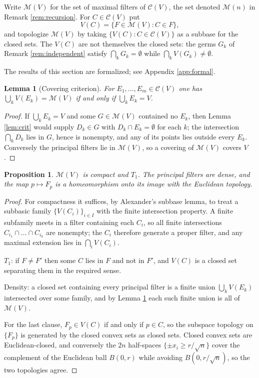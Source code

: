 \documentclass[11pt]{amsart}
\theoremstyle{plain}
\newtheorem{proposition}[theorem]{Proposition}
\newtheorem{lemma}[theorem]{Lemma}
\theoremstyle{definition}
\newcommand{\CC}{\mathscr{C}}
\begin{document}
Write $\mathcal{M}(V)$ for the set of maximal filters of $\CC(V)$, the set denoted $\mathcal{M}(n)$ in Remark \ref{rem:recursion}. For $C\in\CC(V)$ put
\[
V(C)=\{F\in\mathcal{M}(V):C\in F\},
\]
and topologize $\mathcal{M}(V)$ by taking $\{V(C):C\in\CC(V)\}$ as a subbase for the closed sets. The $V(C)$ are not themselves the closed sets: the germs $G_k$ of Remark \ref{rem:independent} satisfy $\bigcap_kG_k=\emptyset$ while $\bigcap_kV(G_k)\neq\emptyset$.

The results of this section are formalized; see Appendix \ref{app:formal}.

\begin{lemma}[Covering criterion]\label{lem:cover}
For $E_1,\dots,E_m\in\CC(V)$ one has $\bigcup_kV(E_k)=\mathcal{M}(V)$ if and only if $\bigcup_kE_k=V$.
\end{lemma}

\begin{proof}
If $\bigcup_kE_k=V$ and some $G\in\mathcal{M}(V)$ contained no $E_k$, then Lemma \ref{lem:crit} would supply $D_k\in G$ with $D_k\cap E_k=\emptyset$ for each $k$; the intersection $\bigcap_kD_k$ lies in $G$, hence is nonempty, and any of its points lies outside every $E_k$. Conversely the principal filters lie in $\mathcal{M}(V)$, so a covering of $\mathcal{M}(V)$ covers $V$.
\end{proof}

\begin{proposition}\label{prop:compact}
$\mathcal{M}(V)$ is compact and $T_1$. The principal filters are dense, and the map $p\mapsto F_p$ is a homeomorphism onto its image with the Euclidean topology.
\end{proposition}

\begin{proof}
For compactness it suffices, by Alexander's subbase lemma, to treat a subbasic family $\{V(C_i)\}_{i\in I}$ with the finite intersection property. A finite subfamily meets in a filter containing each $C_i$, so all finite intersections $C_{i_1}\cap\dots\cap C_{i_k}$ are nonempty; the $C_i$ therefore generate a proper filter, and any maximal extension lies in $\bigcap_iV(C_i)$.

$T_1$: if $F\neq F'$ then some $C$ lies in $F$ and not in $F'$, and $V(C)$ is a closed set separating them in the required sense.

Density: a closed set containing every principal filter is a finite union $\bigcup_kV(E_k)$ intersected over some family, and by Lemma \ref{lem:cover} each such finite union is all of $\mathcal{M}(V)$.

For the last clause, $F_p\in V(C)$ if and only if $p\in C$, so the subspace topology on $\{F_p\}$ is generated by the closed convex sets as closed sets. Closed convex sets are Euclidean-closed, and conversely the $2n$ half-spaces $\{\pm x_i\ge r/\sqrt{n}\}$ cover the complement of the Euclidean ball $B(0,r)$ while avoiding $B(0,r/\sqrt{n})$, so the two topologies agree.
\end{proof}
\end{document}
